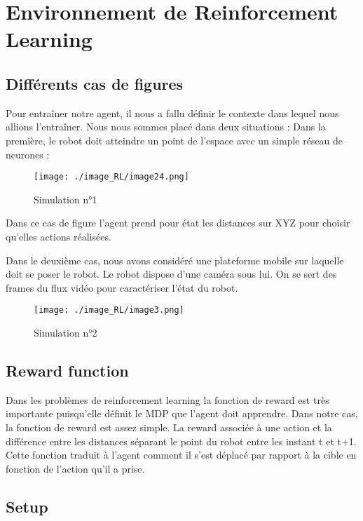 \section{Environnement de Reinforcement Learning}

\subsection{Différents cas de figures}
Pour entraîner notre agent, il nous a fallu définir le contexte dans lequel nous allions l’entraîner.
Nous nous sommes placé dans deux situations :
Dans la première, le robot doit atteindre un point de l’espace avec un simple réseau de neurones : 

\begin{figure}[H]
    \centering
    \texttt{[image: ./image\_RL/image24.png]}
    \caption{Simulation n°1}
\end{figure}

Dans ce cas de figure l’agent prend pour état les distances sur XYZ pour choisir qu’elles actions réalisées. 

Dans le deuxième cas, nous avons considéré une plateforme mobile sur laquelle doit se poser le robot. Le robot dispose d’une caméra sous lui. On se sert des frames du flux vidéo pour caractériser l’état du robot.

\begin{figure}[H]
    \centering
    \texttt{[image: ./image\_RL/image3.png]}
    \caption{Simulation n°2}
\end{figure}

\subsection{Reward function}
Dans les problèmes de reinforcement learning la fonction de reward est très importante puisqu’elle définit le MDP que l’agent doit apprendre.
Dans notre cas, la fonction de reward est assez simple.
La reward associée à une action et la différence entre les distances séparant le point du robot entre les instant t et t+1. 
Cette fonction traduit à l’agent comment il s’est déplacé par rapport à la cible en fonction de l’action qu’il a prise.

\subsection{Setup}

